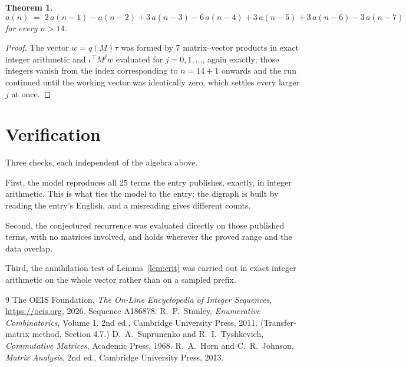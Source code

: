 \documentclass[11pt,a4paper]{article}
\theoremstyle{plain}
\newtheorem{theorem}{Theorem}
\theoremstyle{definition}
\begin{document}
\begin{theorem}
\[
a(n)\;=\;2\,a(n-1) - a(n-2) + 3\,a(n-3) - 6\,a(n-4) + 3\,a(n-5) + 3\,a(n-6) - 3\,a(n-7)
\]
for every $n>14$.
\end{theorem}

\begin{proof}
The vector $w=q(M)\tau$ was formed by $7$ matrix--vector products in exact integer
arithmetic and $\iota^{\!\top}M^{j}w$ evaluated for $j=0,1,\dots$, again exactly; those
integers vanish from the index corresponding to $n=14+1$ onwards and the run continued
until the working vector was identically zero, which settles every larger $j$ at once.
\end{proof}

\section{Verification}

Three checks, each independent of the algebra above.

First, the model reproduces all $25$ terms the entry publishes, exactly, in integer
arithmetic. This is what ties the model to the entry: the digraph is built by reading the
entry's English, and a misreading gives different counts.

Second, the conjectured recurrence was evaluated directly on those published terms, with no
matrices involved, and holds wherever the proved range and the data overlap.

Third, the annihilation test of Lemma~\ref{lem:crit} was carried out in exact integer
arithmetic on the whole vector rather than on a sampled prefix.

\begin{thebibliography}{9}
 The OEIS Foundation, \emph{The On-Line Encyclopedia of Integer
Sequences}, \url{https://oeis.org}, 2026. Sequence A186878.
 R.~P.~Stanley, \emph{Enumerative Combinatorics}, Volume 1, 2nd ed.,
Cambridge University Press, 2011. (Transfer-matrix method, Section 4.7.)
 D.~A.~Suprunenko and R.~I.~Tyshkevich, \emph{Commutative Matrices},
Academic Press, 1968.
 R.~A.~Horn and C.~R.~Johnson, \emph{Matrix Analysis}, 2nd ed., Cambridge
University Press, 2013.
\end{thebibliography}
\end{document}
